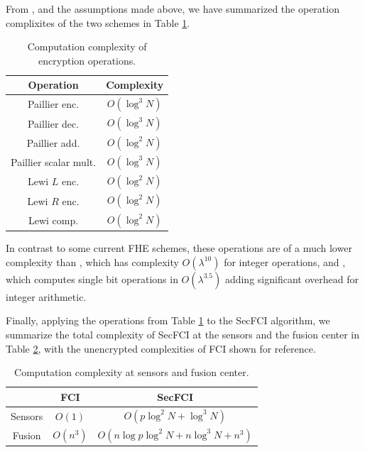 \documentclass[letterpaper, 10 pt, conference]{ieeeconf}  %
\begin{document}
From \cite{paillierPublicKeyCryptosystemsBased1999,lewiOrderRevealingEncryptionNew2016}, and the assumptions made above, we have summarized the operation complixites of the two schemes in Table \ref{tab:complex_ops}.
\begin{table}[tb]
   \centering
   \caption{Computation complexity of encryption operations.}
   \label{tab:complex_ops}
   \begin{tabular}{ |c|c| }
      \hline
      \textbf{Operation} & \textbf{Complexity} \\ 
      \hline
      Paillier enc. & $O(\log^3{N})$ \\ 
      Paillier dec. & $O(\log^3{N})$ \\ 
      Paillier add. & $O(\log^2{N})$ \\ 
      Paillier scalar mult. & $O(\log^3{N})$ \\ 
      Lewi $L$ enc. & $O(\log^2{N})$ \\ 
      Lewi $R$ enc. & $O(\log^2{N})$ \\ 
      Lewi comp. & $O(\log^2{N})$ \\ 
      \hline
   \end{tabular}
   \vspace{-5pt}
   \vspace{-\baselineskip}
\end{table}
In contrast to some current FHE schemes, these operations are of a much lower complexity than \cite{vandijkFullyHomomorphicEncryption2010a}, which has complexity $O(\lambda^{10})$ for integer operations, and \cite{stehleFasterFullyHomomorphic2010}, which computes single bit operations in $O(\lambda^{3.5})$ adding significant overhead for integer arithmetic.

Finally, applying the operations from Table \ref{tab:complex_ops} to the SecFCI algorithm, we summarize the total complexity of SecFCI at the sensors and the fusion center in Table \ref{tab:complex}, with the unencrypted complexities of FCI shown for reference. 
\begin{table}[tb]
   \centering
   \caption{Computation complexity at sensors and fusion center.}
   \label{tab:complex}
   \begin{tabular}{ |c|c|c| }
      \hline
       & \textbf{FCI} & \textbf{SecFCI} \\ 
      \hline
      Sensors & $O(1)$ & $O\left(p\log^2{N} + \log^3{N}\right)$ \\ 
      Fusion & $O(n^3)$ & $O\left(n\log{p}\log^2{N} + n\log^3{N} + n^3\right)$ \\ 
      \hline
   \end{tabular}
\end{table}
\end{document}
